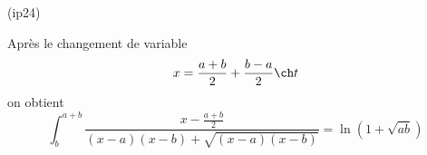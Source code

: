 \begin{tiny}(ip24)\end{tiny} Après le changement de variable
\begin{displaymath}
 x=\frac{a+b}{2} + \frac{b-a}{2}\ch t 
\end{displaymath}
on obtient
\begin{displaymath}
 \int_{b}^{a+b}\frac{x-\frac{a+b}{2}}{(x-a)(x-b)+\sqrt{(x-a)(x-b)}}
=\ln(1+\sqrt{ab})
\end{displaymath}
